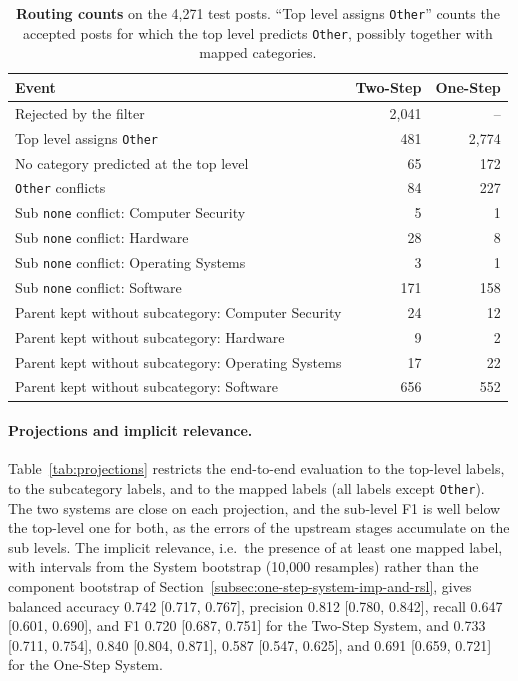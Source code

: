 \begin{table}
    \centering
    \caption{\textbf{Routing counts} on the 4,271 test posts. ``Top level assigns \texttt{Other}'' counts the accepted posts for which the top level predicts \texttt{Other}, possibly together with mapped categories.}
    \label{tab:routing}
    \small
    \begin{tabular}{lrr}
        \hline
        \textbf{Event} & \textbf{Two-Step} & \textbf{One-Step} \\
        \hline
        Rejected by the filter & 2,041 & -- \\
        Top level assigns \texttt{Other} & 481 & 2,774 \\
        No category predicted at the top level & 65 & 172 \\
        \texttt{Other} conflicts & 84 & 227 \\
        Sub \texttt{none} conflict: Computer Security & 5 & 1 \\
        Sub \texttt{none} conflict: Hardware & 28 & 8 \\
        Sub \texttt{none} conflict: Operating Systems & 3 & 1 \\
        Sub \texttt{none} conflict: Software & 171 & 158 \\
        Parent kept without subcategory: Computer Security & 24 & 12 \\
        Parent kept without subcategory: Hardware & 9 & 2 \\
        Parent kept without subcategory: Operating Systems & 17 & 22 \\
        Parent kept without subcategory: Software & 656 & 552 \\
        \hline
    \end{tabular}
\end{table}

\paragraph{Projections and implicit relevance.} Table~\ref{tab:projections} restricts the end-to-end evaluation to the top-level labels, to the subcategory labels, and to the mapped labels (all labels except \texttt{Other}). The two systems are close on each projection, and the sub-level F1 is well below the top-level one for both, as the errors of the upstream stages accumulate on the sub levels. The implicit relevance, i.e.\ the presence of at least one mapped label, with intervals from the System bootstrap (10,000 resamples) rather than the component bootstrap of Section~\ref{subsec:one-step-system-imp-and-rsl}, gives balanced accuracy 0.742 [0.717, 0.767], precision 0.812 [0.780, 0.842], recall 0.647 [0.601, 0.690], and F1 0.720 [0.687, 0.751] for the Two-Step System, and 0.733 [0.711, 0.754], 0.840 [0.804, 0.871], 0.587 [0.547, 0.625], and 0.691 [0.659, 0.721] for the One-Step System.


